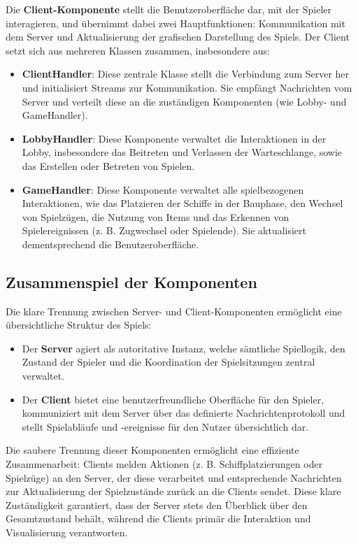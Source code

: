 \documentclass[12pt]{article}
\begin{document}
Die \textbf{Client-Komponente} stellt die Benutzeroberfläche dar, mit der Spieler interagieren, und übernimmt dabei zwei Hauptfunktionen: Kommunikation mit dem Server und Aktualisierung der grafischen Darstellung des Spiels. Der Client setzt sich aus mehreren Klassen zusammen, insbesondere aus:
\begin{itemize}
    \item \textbf{ClientHandler}: Diese zentrale Klasse stellt die Verbindung zum Server her und initialisiert Streams zur Kommunikation. Sie empfängt Nachrichten vom Server und verteilt diese an die zuständigen Komponenten (wie Lobby- und GameHandler).
    \item \textbf{LobbyHandler}: Diese Komponente verwaltet die Interaktionen in der Lobby, insbesondere das Beitreten und Verlassen der Warteschlange, sowie das Erstellen oder Betreten von Spielen.
    \item \textbf{GameHandler}: Diese Komponente verwaltet alle spielbezogenen Interaktionen, wie das Platzieren der Schiffe in der Bauphase, den Wechsel von Spielzügen, die Nutzung von Items und das Erkennen von Spielereignissen (z. B. Zugwechsel oder Spielende). Sie aktualisiert dementsprechend die Benutzeroberfläche.
\end{itemize}

\subsection*{Zusammenspiel der Komponenten}

Die klare Trennung zwischen Server- und Client-Komponenten ermöglicht eine übersichtliche Struktur des Spiels:
\begin{itemize}
    \item Der \textbf{Server} agiert als autoritative Instanz, welche sämtliche Spiellogik, den Zustand der Spieler und die Koordination der Spielsitzungen zentral verwaltet.
    \item Der \textbf{Client} bietet eine benutzerfreundliche Oberfläche für den Spieler, kommuniziert mit dem Server über das definierte Nachrichtenprotokoll und stellt Spielabläufe und -ereignisse für den Nutzer übersichtlich dar.
\end{itemize}

Die saubere Trennung dieser Komponenten ermöglicht eine effiziente Zusammenarbeit: Clients melden Aktionen (z. B. Schiffplatzierungen oder Spielzüge) an den Server, der diese verarbeitet und entsprechende Nachrichten zur Aktualisierung der Spielzustände zurück an die Clients sendet. Diese klare Zuständigkeit garantiert, dass der Server stets den Überblick über den Gesamtzustand behält, während die Clients primär die Interaktion und Visualisierung verantworten.
\end{document}
